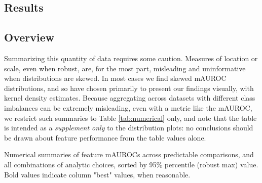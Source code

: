 \documentclass[12pt]{spieman}  %
\begin{document}
\begin{spacing}{2}
\section{Results}
\label{sec:results}

\subsection{Overview}

Summarizing this quantity of data requires some caution. Measures of location
or scale, even when robust, are, for the most part, misleading and
uninformative when distributions are skewed. In most cases we find skewed
mAUROC distributions, and so have chosen primarily to present our findings
visually, with kernel density estimates.  Because aggregating across datasets
with different class imbalances can be extremely misleading, even with a metric
like the mAUROC\cite{brabecModelEvaluationNonconstant2020}, we restrict such
summaries to Table \ref{tab:numerical} only, and note that the table is
intended as a \textit{supplement only} to the distribution plots: no
conclusions should be drawn about feature performance from the table values
alone.

\begin{table}[h!]
\caption{Numerical summaries of feature mAUROCs across predictable comparisons,
and all combinations of analytic choices, sorted by 95\% percentile (robust
max) value. Bold values indicate column "best" values, when reasonable.}
\label{tab:numerical}
\small
\centering


\end{table}
\end{spacing}
\end{document}
